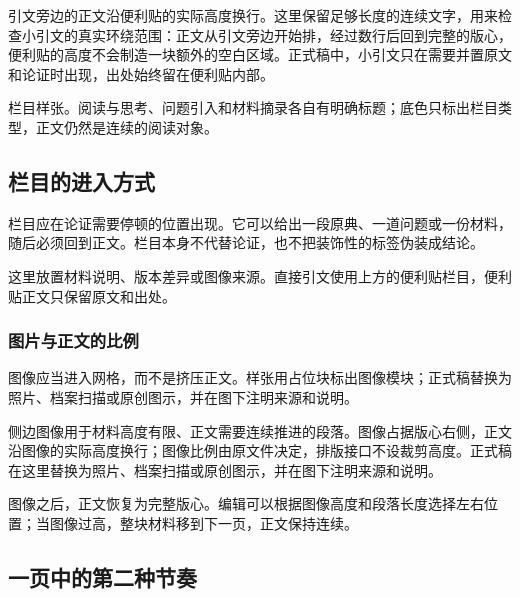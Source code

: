 \noindent 引文旁边的正文沿便利贴的实际高度换行。这里保留足够长度的连续文字，用来检查小引文的真实环绕范围：正文从引文旁边开始排，经过数行后回到完整的版心，便利贴的高度不会制造一块额外的空白区域。正式稿中，小引文只在需要并置原文和论证时出现，出处始终留在便利贴内部。
\bookwrapclear

\begin{readingbox}
栏目样张。阅读与思考、问题引入和材料摘录各自有明确标题；底色只标出栏目类型，正文仍然是连续的阅读对象。
\end{readingbox}

\subsection{栏目的进入方式}

栏目应在论证需要停顿的位置出现。它可以给出一段原典、一道问题或一份材料，随后必须回到正文。栏目本身不代替论证，也不把装饰性的标签伪装成结论。

\begin{sourcebox}[原典与材料]
这里放置材料说明、版本差异或图像来源。直接引文使用上方的便利贴栏目，便利贴正文只保留原文和出处。
\end{sourcebox}


\subsubsection{图片与正文的比例}

图像应当进入网格，而不是挤压正文。样张用占位块标出图像模块；正式稿替换为照片、档案扫描或原创图示，并在图下注明来源和说明。

侧边图像用于材料高度有限、正文需要连续推进的段落。图像占据版心右侧，正文沿图像的实际高度换行；图像比例由原文件决定，排版接口不设裁剪高度。正式稿在这里替换为照片、档案扫描或原创图示，并在图下注明来源和说明。

图像之后，正文恢复为完整版心。编辑可以根据图像高度和段落长度选择左右位置；当图像过高，整块材料移到下一页，正文保持连续。
\bookwrapclear

\subsection{一页中的第二种节奏}


